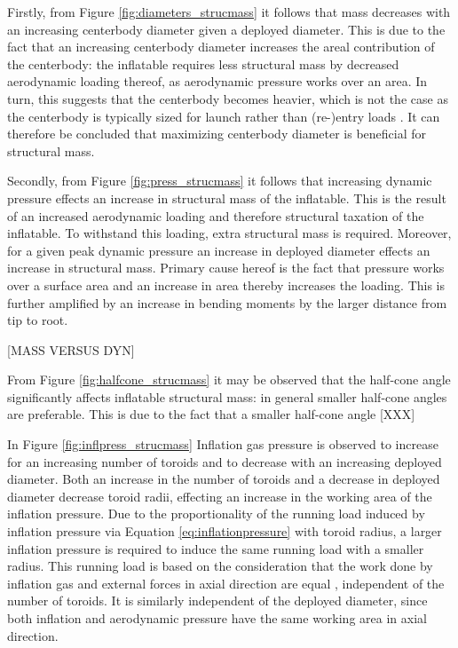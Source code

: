 Firstly, from Figure \ref{fig:diameters_strucmass} it follows that mass decreases with an increasing centerbody diameter given a deployed diameter. This is due to the fact that an increasing centerbody diameter increases the areal contribution of the centerbody: the inflatable requires less structural mass by decreased aerodynamic loading thereof, as aerodynamic pressure works over an area. In turn, this suggests that the centerbody becomes heavier, which is not the case as the centerbody is typically sized for launch rather than (re-)entry loads \cite{Lindell2006}. It can therefore be concluded that maximizing centerbody diameter is beneficial for structural mass. 

Secondly, from Figure \ref{fig:press_strucmass} it follows that increasing dynamic pressure effects an increase in structural mass of the inflatable. This is the result of an increased aerodynamic loading and therefore structural taxation of the inflatable. To withstand this loading, extra structural mass is required. Moreover, for a given peak dynamic pressure an increase in deployed diameter effects an increase in structural mass. Primary cause hereof is the fact that pressure works over a surface area and an increase in area thereby increases the loading. This is further amplified by an increase in bending moments by the larger distance from tip to root.

[MASS VERSUS DYN]

From Figure \ref{fig:halfcone_strucmass} it may be observed that the half-cone angle significantly affects inflatable structural mass: in general smaller half-cone angles are preferable. This is due to the fact that a smaller half-cone angle [XXX]

In Figure \ref{fig:inflpress_strucmass} Inflation gas pressure is observed to increase for an increasing number of toroids and to decrease with an increasing deployed diameter. Both an increase in the number of toroids and a decrease in deployed diameter decrease toroid radii, effecting an increase in the working area of the inflation pressure. Due to the proportionality of the running load induced by inflation pressure via Equation \ref{eq:inflationpressure} with toroid radius, a larger inflation pressure is required to induce the same running load with a smaller radius. This running load is based on the consideration that the work done by inflation gas and external forces in axial direction are equal \cite{Brown2009}, independent of the number of toroids. It is similarly independent of the deployed diameter, since both inflation and aerodynamic pressure have the same working area in axial direction.

